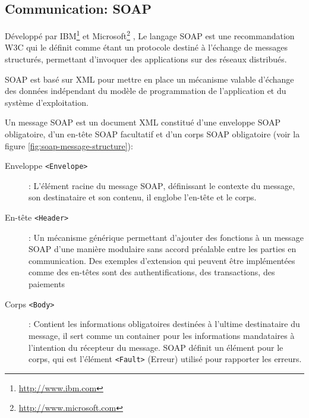   \subsection{Communication: SOAP}
  \label{sec:soap}
  Développé par IBM\footnote{\url{http://www.ibm.com}} et
  Microsoft\footnote{\url{http://www.microsoft.com}}
  \cite{box2000simple}, Le langage \textsc{SOAP} est une
  recommandation \textsc{W3C} \cite{mitra2003soap} qui le définit
  comme étant un protocole destiné à l'échange de messages structurés,
  permettant d'invoquer des applications sur des réseaux distribués.

  \textsc{SOAP} est basé sur \textsc{XML} pour mettre en place un
  mécanisme valable d'échange des données indépendant du modèle de
  programmation de l'application et du système d'exploitation.

  Un message \textsc{SOAP} est un document XML constitué d'une
  enveloppe \textsc{SOAP} obligatoire, d'un en-tête \textsc{SOAP}
  facultatif et d'un corps \textsc{SOAP} obligatoire (voir la figure
  \ref{fig:soap-message-structure}):

  

  \renewcommand{\descriptionlabel}[1]{\hspace{1cm}\textbullet~\textsf{#1}}
  \begin{description}
  \item[Enveloppe \texttt{<Envelope>}]: L'élément racine du message
    \textsc{SOAP}, définissant le contexte du message, son
    destinataire et son contenu, il englobe l'en-tête et le corps.

  \item[En-tête \texttt{<Header>}]: Un mécanisme générique permettant
    d'ajouter des fonctions à un message \textsc{SOAP} d'une manière
    modulaire sans accord préalable entre les parties en
    communication.  Des exemples d'extension qui peuvent être
    implémentées comme des en-têtes sont des authentifications, des
    transactions, des paiements

  \item[Corps \texttt{<Body>}]: Contient les informations obligatoires
    destinées à l'ultime destinataire du message, il sert comme un
    container pour les informations mandataires à l'intention du
    récepteur du message. \textsc{SOAP} définit un élément pour le
    corps, qui est l'élément \texttt{<Fault>} (Erreur) utilisé pour
    rapporter les erreurs.
  \end{description}

